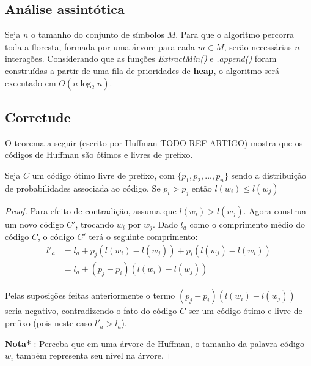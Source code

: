 \subsection{Análise assintótica}
Seja $n$ o tamanho do conjunto de símbolos $M$. 
Para que o algoritmo percorra toda a floresta, formada por uma árvore para cada $m \in M$, serão necessárias $n$ interações.
Considerando que as funções \emph{ExtractMin()} e \emph{.append()} foram construídas a partir de uma fila de prioridades de \textbf{heap}, o algoritmo será executado em  $O(n \log_2 n)$.

\subsection{Corretude}
O teorema a seguir (escrito por Huffman TODO REF ARTIGO) mostra  que os códigos de Huffman são ótimos e livres de prefixo.


\begin{lemma} \label{lemma:dist_prob_avg_size} Seja $C$ um código ótimo livre de prefixo, com $\{ p_1, p_2,..., p_n\}$ sendo a distribuição de probabilidades associada ao código. 
Se $p_i > p_j$ então $l(w_i) \leq l(w_j)$

\begin{proof} 
Para efeito de contradição, assuma que $l(w_i) > l(w_j)$. 
Agora construa um novo código $C'$, trocando $w_i$ por $w_j$. Dado $l_a$ como o comprimento médio do código $C$, o código $C'$ terá o seguinte comprimento:
\begin{align*}
l'_a &= l_a + p_j(l(w_i) - l(w_j)) + p_i(l(w_j) - l(w_i)) \\
&= l_a + (p_j - p_i)(l(w_i) - l(w_j)) 
\end{align*}

Pelas suposições feitas anteriormente o termo $(p_j - p_i)(l(w_i) - l(w_j))$ seria negativo, contradizendo o fato do código $C$ ser um código ótimo e livre de prefixo (pois neste caso $l'_a > l_a$).

\textbf{Nota*} : Perceba que em uma árvore de Huffman, o tamanho da palavra código $w_i$ também representa seu nível na árvore.
\end{proof}
\end{lemma}


